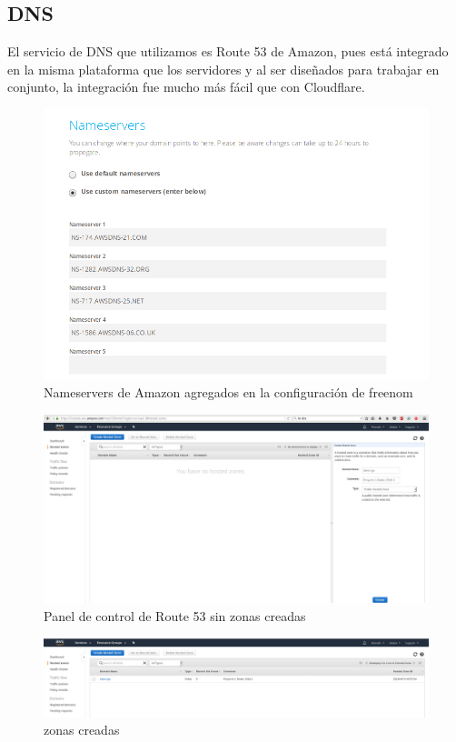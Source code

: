 \documentclass[9pt]{article}
\begin{document}
\subsection*{DNS}
El servicio de \textsf{DNS} que utilizamos es \textsf{Route 53} de Amazon, pues está integrado en la misma plataforma que los servidores y al ser diseñados para trabajar en conjunto, la integración fue mucho más fácil que con Cloudflare.
\begin{figure}[H]
  \centering
  \includegraphics[width=0.8\linewidth]{nameservers}
  \caption{Nameservers de Amazon agregados en la configuración de freenom}
\end{figure}
\begin{figure}[H]
  \centering
  \includegraphics[width=0.8\linewidth]{DNS_management}
  \caption{Panel de control de Route 53 sin zonas creadas}
\end{figure}
\begin{figure}[H]
  \centering
  \includegraphics[width=0.8\linewidth]{HostedZones}
  \caption{zonas creadas}
\end{figure}
\end{document}
